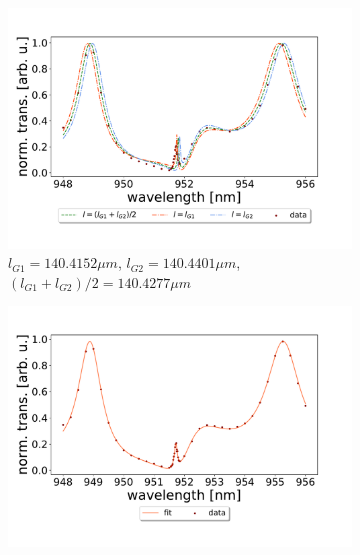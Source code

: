 \begin{figure}[h!]
    \centering
    \begin{subfigure}[b]{0.49\textwidth}
        \centering
        \includegraphics[width=\textwidth]{figures/results/129um_long_scan_sim_comparison.pdf}
        \caption{$l_{G1} = 140.4152 \mu m$, $l_{G2} = 140.4401 \mu m$, $(l_{G1} + l_{G2})/2 = 140.4277 \mu m$}
        \label{fig:129um_long_scan_sim_comparison}
    \end{subfigure}
    \begin{subfigure}[b]{0.49\textwidth}
        \centering
        \includegraphics[width=\textwidth]{figures/results/129um_long_scan_fit.pdf}
        \caption{}
        \label{fig:129um_long_scan_fit}
    \end{subfigure}
\end{figure}

